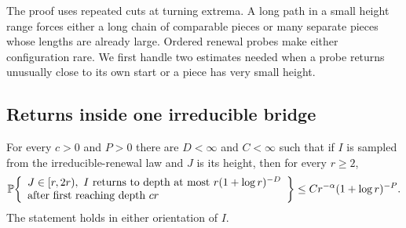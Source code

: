 The proof uses repeated cuts at turning extrema. A long path in a
small height range forces either a long chain of comparable pieces or
many separate pieces whose lengths are already large. Ordered renewal
probes make either configuration rare. We first handle two estimates
needed when a probe returns unusually close to its own start or a
piece has very small height.

\subsection{Returns inside one irreducible bridge}

\begin{lemma}\label{lem:11-small-return}
For every $c>0$ and $P>0$ there are $D<\infty$ and $C<\infty$ such that
if $I$ is sampled from the irreducible-renewal law and $J$ is its
height, then for every $r\ge2$,
\begin{equation}
 \mathbb P\!\left\{\begin{array}{l}
 J\in[r,2r),\ \text{$I$ returns to depth at most}
       \ r(1+\log r)^{-D}\\
 \text{after first reaching depth }cr
 \end{array}\right\}
 \le C r^{-\alpha}(1+\log r)^{-P}.
 \label{eq:T-36}
\end{equation}
The statement holds in either orientation of $I$.
\end{lemma}

